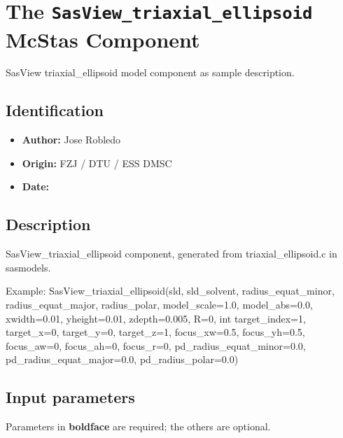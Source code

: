 \section{The \texttt{SasView\_triaxial\_ellipsoid} McStas Component}
SasView triaxial\_ellipsoid model component as sample description.

\subsection*{Identification}
\begin{itemize}
  \item \textbf{Author:} Jose Robledo
  \item \textbf{Origin:} FZJ / DTU / ESS DMSC
  \item \textbf{Date:} 
\end{itemize}

\subsection*{Description}
SasView\_triaxial\_ellipsoid component, generated from triaxial\_ellipsoid.c in sasmodels.

Example: SasView\_triaxial\_ellipsoid(sld, sld\_solvent, radius\_equat\_minor, radius\_equat\_major, radius\_polar, model\_scale=1.0, model\_abs=0.0, xwidth=0.01, yheight=0.01, zdepth=0.005, R=0, int target\_index=1, target\_x=0, target\_y=0, target\_z=1, focus\_xw=0.5, focus\_yh=0.5, focus\_aw=0, focus\_ah=0, focus\_r=0, pd\_radius\_equat\_minor=0.0, pd\_radius\_equat\_major=0.0, pd\_radius\_polar=0.0)

\subsection*{Input parameters}
Parameters in \textbf{boldface} are required; the others are optional.

